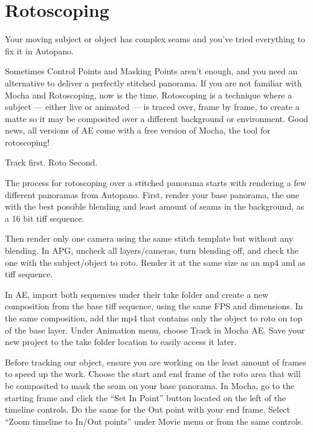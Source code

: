 \chapter{Rotoscoping}
\pagecolor{white}
\label{chap:50}
\begin{fullwidth}

\problem

{\large Your moving subject or object has complex seams and you’ve tried everything to fix it in Autopano. \par}

Sometimes Control Points and Masking Points aren’t enough, and you need an alternative to deliver a perfectly stitched panorama. If you are not familiar with Mocha and Rotoscoping, now is the time. Rotoscoping is a technique where a subject — either live or animated — is traced over, frame by frame, to create a matte so it may be composited over a different background or environment. Good news, all versions of AE come with a free version of Mocha, the tool for rotoscoping! 

\clearpage
\solution

{\large Track first. Roto Second. \par}

The process for rotoscoping over a stitched panorama starts with rendering a few different panoramas from Autopano. First, render your base panorama, the one with the best possible blending and least amount of seams in the background, as a 16 bit tiff sequence. 


Then render only one camera using the same stitch template but without any blending. In APG, uncheck all layers/cameras, turn blending off, and check the one with the subject/object to roto. Render it at the same size as an mp4 and as tiff sequence.


In AE, import both sequences under their take folder and create a new composition from the base tiff sequence, using the same FPS and dimensions. In the same composition, add the mp4 that contains only the object to roto on top of the base layer. Under Animation menu, choose Track in Mocha AE. Save your new project to the take folder location to easily access it later. 


Before tracking our object, ensure you are working on the least amount of frames to speed up the work. Choose the start and end frame of the roto area that will be composited to mask the seam on your base panorama. In Mocha, go to the starting frame and click the “Set In Point” button located on the left of the timeline controls. Do the same for the Out point with your end frame. Select “Zoom timeline to In/Out points” under Movie menu or from the same controls.


\end{fullwidth}
